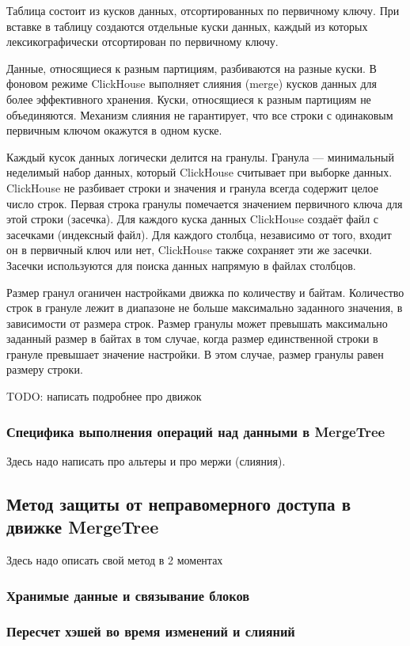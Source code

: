 Таблица состоит из кусков данных, отсортированных по первичному ключу. При вставке в таблицу создаются отдельные куски данных, каждый из которых лексикографически отсортирован по первичному ключу.

Данные, относящиеся к разным партициям, разбиваются на разные куски. В фоновом режиме ClickHouse выполняет слияния (merge) кусков данных для более эффективного хранения. Куски, относящиеся к разным партициям не объединяются. Механизм слияния не гарантирует, что все строки с одинаковым первичным ключом окажутся в одном куске.

Каждый кусок данных логически делится на гранулы. Гранула --- минимальный неделимый набор данных, который ClickHouse считывает при выборке данных. ClickHouse не разбивает строки и значения и гранула всегда содержит целое число строк. Первая строка гранулы помечается значением первичного ключа для этой строки (засечка). Для каждого куска данных ClickHouse создаёт файл с засечками (индексный файл). Для каждого столбца, независимо от того, входит он в первичный ключ или нет, ClickHouse также сохраняет эти же засечки. Засечки используются для поиска данных напрямую в файлах столбцов.

Размер гранул оганичен настройками движка по количеству и байтам. Количество строк в грануле лежит в диапазоне не больше максимально заданного значения, в зависимости от размера строк. Размер гранулы может превышать максимально заданный размер в байтах в том случае, когда размер единственной строки в грануле превышает значение настройки. В этом случае, размер гранулы равен размеру строки.

TODO: написать подробнее про движок

\subsubsection{Специфика выполнения операций над данными в MergeTree}

Здесь надо написать про альтеры и про мержи (слияния).

\subsection{Метод защиты от неправомерного доступа в движке MergeTree}

Здесь надо описать свой метод в 2 моментах

\subsubsection{Хранимые данные и связывание блоков}

\subsubsection{Пересчет хэшей во время изменений и слияний}

\pagebreak